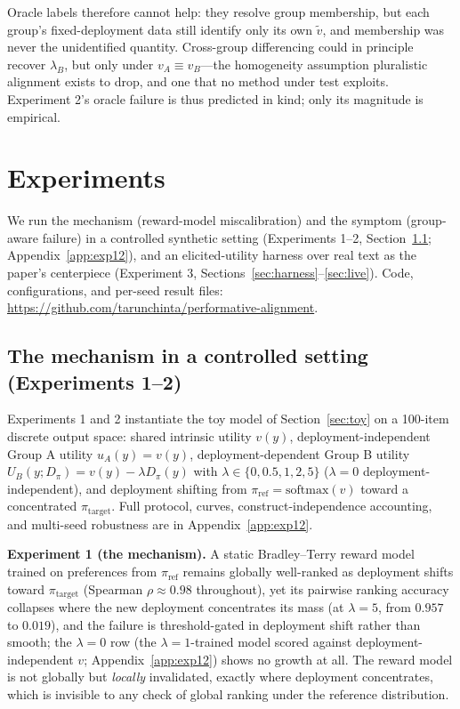 ﻿\documentclass[11pt]{article}
\begin{document}
Oracle labels therefore cannot help: they resolve group membership, but each group's fixed-deployment data still identify only its own \(\tilde v\), and membership was never the unidentified quantity. Cross-group differencing could in principle recover \(\lambda_B\), but only under \(v_A \equiv v_B\)---the homogeneity assumption pluralistic alignment exists to drop, and one that no method under test exploits. Experiment 2's oracle failure is thus predicted in kind; only its magnitude is empirical.


\section{Experiments}
\label{sec:experiments}

We run the mechanism (reward-model miscalibration) and the symptom (group-aware failure) in a controlled synthetic setting (Experiments 1--2, Section~\ref{sec:exp12}; Appendix~\ref{app:exp12}), and an elicited-utility harness over real text as the paper's centerpiece (Experiment 3, Sections~\ref{sec:harness}--\ref{sec:live}). Code, configurations, and per-seed result files: \url{https://github.com/tarunchinta/performative-alignment}.

\subsection{The mechanism in a controlled setting (Experiments 1--2)}
\label{sec:exp12}

Experiments 1 and 2 instantiate the toy model of Section~\ref{sec:toy} on a 100-item discrete output space: shared intrinsic utility \(v(y)\), deployment-independent Group A utility \(u_A(y) = v(y)\), deployment-dependent Group B utility \(U_B(y; D_\pi) = v(y) - \lambda D_\pi(y)\) with \(\lambda \in \{0, 0.5, 1, 2, 5\}\) (\(\lambda = 0\) deployment-independent), and deployment shifting from \(\pi_{\text{ref}} = \mathrm{softmax}(v)\) toward a concentrated \(\pi_{\text{target}}\). Full protocol, curves, construct-independence accounting, and multi-seed robustness are in Appendix~\ref{app:exp12}.

\textbf{Experiment 1 (the mechanism).} A static Bradley--Terry reward model trained on preferences from \(\pi_{\text{ref}}\) remains globally well-ranked as deployment shifts toward \(\pi_{\text{target}}\) (Spearman \(\rho \approx 0.98\) throughout), yet its pairwise ranking accuracy collapses where the new deployment concentrates its mass (at \(\lambda = 5\), from \(0.957\) to \(0.019\)), and the failure is threshold-gated in deployment shift rather than smooth; the \(\lambda = 0\) row (the \(\lambda = 1\)-trained model scored against deployment-independent \(v\); Appendix~\ref{app:exp12}) shows no growth at all. The reward model is not globally but \emph{locally} invalidated, exactly where deployment concentrates, which is invisible to any check of global ranking under the reference distribution.
\end{document}
